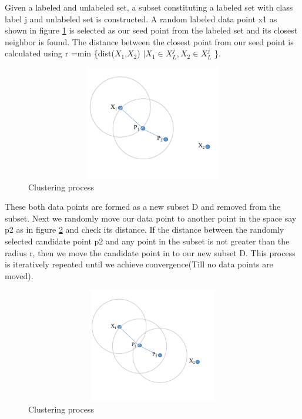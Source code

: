 \documentclass[10pt, conference, compsocconf]{IEEEtran}
\begin{document}
Given a labeled and unlabeled set, a subset constituting a labeled set with class label j and unlabeled set is constructed. A random labeled data point x1 as shown in figure \ref{fig:3-Clustering 1} is selected as our seed point from the labeled set and its  closest neighbor is found. The distance between the closest point from our seed point is calculated using r =min \{dist($X_{1}$,$X_{2}$) $\mid X_{1} \in X^{j}_L,X_{2} \in X^{j}_L$ \}.

\begin{figure}[H]
\centering
\includegraphics[width=20cm,height=5cm,keepaspectratio]{myraimage.png}
\caption{\label{fig:3-Clustering 1} Clustering process}
\end{figure}
These both data points are formed  as a new subset D and removed from the subset. Next we randomly move our data point to another point in the space say p2 as in figure \ref{fig:4-Clustering 1} and check its distance. If the distance between the randomly selected candidate point p2 and  any point in the subset is not greater than the radius r, then we move the candidate point in to our new subset D. This process is iteratively repeated until we achieve convergence(Till no data points are moved).
\begin{figure}[H]
\centering
\includegraphics[width=20cm,height=5cm,keepaspectratio]{23.png}
\caption{\label{fig:4-Clustering 1} Clustering process}
\end{figure}
\end{document}
